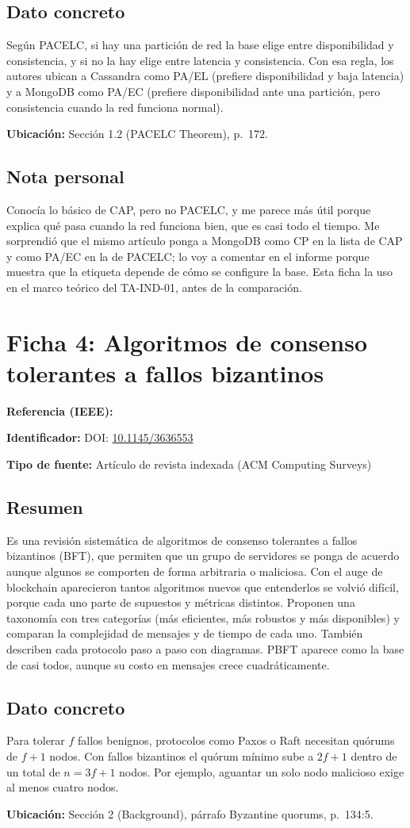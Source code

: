 \documentclass[11pt,a4paper]{article}
\newcommand{\campo}[2]{\noindent\textbf{#1:} #2\par\smallskip}
\newcommand{\ficha}[1]{\section*{#1}}
\newcommand{\parte}[1]{\subsection*{#1}}
\begin{document}
\parte{Dato concreto}
Según PACELC, si hay una partición de red la base elige entre disponibilidad y
consistencia, y si no la hay elige entre latencia y consistencia. Con esa regla, los autores
ubican a Cassandra como PA/EL (prefiere disponibilidad y baja latencia) y a MongoDB como
PA/EC (prefiere disponibilidad ante una partición, pero consistencia cuando la red funciona
normal).

\campo{Ubicación}{Sección 1.2 (PACELC Theorem), p.~172.}

\parte{Nota personal}
Conocía lo básico de CAP, pero no PACELC, y me parece más útil porque explica qué pasa
cuando la red funciona bien, que es casi todo el tiempo. Me sorprendió que el mismo
artículo ponga a MongoDB como CP en la lista de CAP y como PA/EC en la de PACELC; lo voy a
comentar en el informe porque muestra que la etiqueta depende de cómo se configure la base.
Esta ficha la uso en el marco teórico del TA-IND-01, antes de la comparación.

\ficha{Ficha 4: Algoritmos de consenso tolerantes a fallos bizantinos}

\campo{Referencia (IEEE)}{}
\campo{Identificador}{DOI: \href{https://doi.org/10.1145/3636553}{10.1145/3636553}}
\campo{Tipo de fuente}{Artículo de revista indexada (ACM Computing Surveys)}

\parte{Resumen}
Es una revisión sistemática de algoritmos de consenso tolerantes a fallos bizantinos (BFT),
que permiten que un grupo de servidores se ponga de acuerdo aunque algunos se comporten
de forma arbitraria o maliciosa. Con el auge de blockchain aparecieron tantos algoritmos
nuevos que entenderlos se volvió difícil, porque cada uno parte de supuestos y métricas
distintos. Proponen una taxonomía con tres categorías (más eficientes, más robustos y más
disponibles) y comparan la complejidad de mensajes y de tiempo de cada uno. También
describen cada protocolo paso a paso con diagramas. PBFT aparece como la base de casi
todos, aunque su costo en mensajes crece cuadráticamente.

\parte{Dato concreto}
Para tolerar $f$ fallos benignos, protocolos como Paxos o Raft necesitan quórums de $f+1$
nodos. Con fallos bizantinos el quórum mínimo sube a $2f+1$ dentro de un total de
$n = 3f+1$ nodos. Por ejemplo, aguantar un solo nodo malicioso exige al menos cuatro nodos.

\campo{Ubicación}{Sección 2 (Background), párrafo Byzantine quorums, p.~134:5.}
\end{document}
